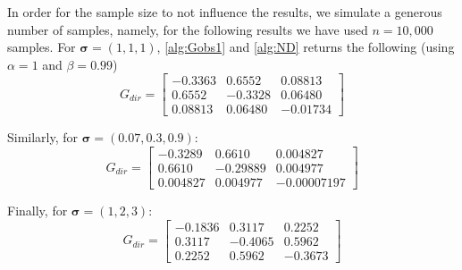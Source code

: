\documentclass[../Thesis.tex]{subfiles}
\begin{document}
In order for the sample size to not influence the results, we simulate a generous number of samples, namely, for the following results we have used $n = 10{,}000$ samples. For $\boldsymbol\sigma = (1,1,1)$, \autoref{alg:Gobs1} and \autoref{alg:ND} returns the following (using $\alpha = 1$ and $\beta = 0.99$)
\begin{equation} \label{eq:s medium G_dir}
    G_{dir} =
    \begin{bmatrix}
        -0.3363 & 0.6552  & 0.08813  \\
        0.6552  & -0.3328 & 0.06480  \\
        0.08813 & 0.06480 & -0.01734
    \end{bmatrix}
\end{equation}




Similarly, for $\boldsymbol\sigma = (0.07, 0.3, 0.9)$:
\begin{equation} \label{eq:s small G_dir}
    G_{dir} =
    \begin{bmatrix}
        -0.3289  & 0.6610   & 0.004827    \\
        0.6610   & -0.29889 & 0.004977    \\
        0.004827 & 0.004977 & -0.00007197
    \end{bmatrix}
\end{equation}



Finally, for $\boldsymbol\sigma = (1,2,3)$:
$$ G_{dir} =
    \begin{bmatrix}
        -0.1836 & 0.3117  & 0.2252  \\
        0.3117  & -0.4065 & 0.5962  \\
        0.2252  & 0.5962  & -0.3673
    \end{bmatrix}
$$

\end{document}
